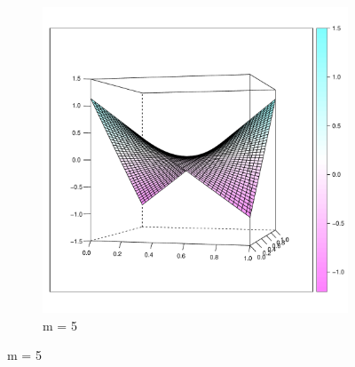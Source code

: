 \begin{figure}
	\centering 
	\begin{subfigure}
		[b]{0.40 
		\textwidth} \centering 
		\includegraphics[width= 
		\textwidth]{Images-nonparametric/cy-fit-wireframe-m5.pdf} \caption{m = 5} \label{} 
	\end{subfigure}
	

\end{figure}
